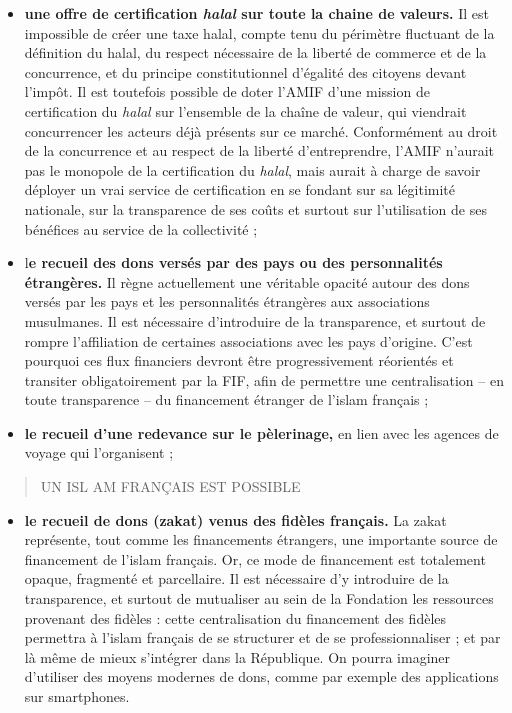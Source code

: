\begin{itemize}
\item
  \textbf{une offre de certification \emph{halal} sur toute la chaine de
  valeurs.} Il est impossible de créer une taxe halal, compte tenu du
  périmètre fluctuant de la définition du halal, du respect nécessaire
  de la liberté de commerce et de la concurrence, et du principe
  constitutionnel d'égalité des citoyens devant l'impôt. Il est
  toutefois possible de doter l'AMIF d'une mission de certification du
  \emph{halal} sur l'ensemble de la chaîne de valeur, qui viendrait
  concurrencer les acteurs déjà présents sur ce marché. Conformément au
  droit de la concurrence et au respect de la liberté d'entreprendre,
  l'AMIF n'aurait pas le monopole de la certification du \emph{halal},
  mais aurait à charge de savoir déployer un vrai service de
  certification en se fondant sur sa légitimité nationale, sur la
  transparence de ses coûts et surtout sur l'utilisation de ses
  bénéfices au service de la collectivité ;
\item
  l\textbf{e recueil des dons versés par des pays ou des personnalités
  étrangères.} Il règne actuellement une véritable opacité autour des
  dons versés par les pays et les personnalités étrangères aux
  associations musulmanes. Il est nécessaire d'introduire de la
  transparence, et surtout de rompre l'affiliation de certaines
  associations avec les pays d'origine. C'est pourquoi ces flux
  financiers devront être progressivement réorientés et transiter
  obligatoirement par la FIF, afin de permettre une centralisation -- en
  toute transparence -- du financement étranger de l'islam français ;
\item
  \textbf{le recueil d'une redevance sur le pèlerinage,} en lien avec
  les agences de voyage qui l'organisent ;
\end{itemize}

\begin{quote}
UN ISL AM FRANÇAIS EST POSSIBLE
\end{quote}

\begin{itemize}
\item
  \textbf{le recueil de dons (zakat) venus des fidèles français.} La
  zakat représente, tout comme les financements étrangers, une
  importante source de financement de l'islam français. Or, ce mode de
  financement est totalement opaque, fragmenté et parcellaire. Il est
  nécessaire d'y introduire de la transparence, et surtout de mutualiser
  au sein de la Fondation les ressources provenant des fidèles : cette
  centralisation du financement des fidèles permettra à l'islam français
  de se structurer et de se professionnaliser ; et par là même de mieux
  s'intégrer dans la République. On pourra imaginer d'utiliser des
  moyens modernes de dons, comme par exemple des applications sur
  smartphones.
\end{itemize}

